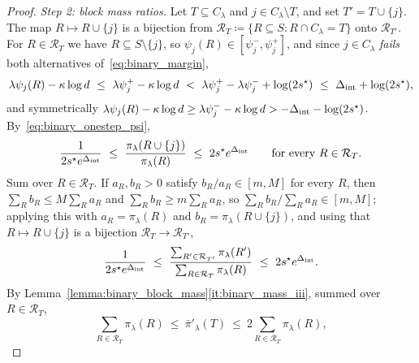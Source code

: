 \documentclass[aos]{imsart}%
\theoremstyle{plain}
\theoremstyle{definition}
\begin{document}
\begin{proof}
        \emph{Step 2: block mass ratios.} Let $T\subseteq C_\lambda$ and
        $j\in C_\lambda\setminus T$, and set $T'=T\cup\{j\}$. The map
        $R\mapsto R\cup\{j\}$ is a bijection from
        $\mathcal{R}_T\coloneq\{R\subseteq S:R\cap C_\lambda=T\}$ onto
        $\mathcal{R}_{T'}$. For $R\in\mathcal{R}_T$ we have
        $R\subseteq S\setminus\{j\}$, so
        $\psi_j(R)\in[\psi_j^{-},\psi_j^{+}]$, and since $j\in C_\lambda$
        \emph{fails} both alternatives of~\eqref{eq:binary_margin},
        \begin{equation*}
            \lambda\psi_j(R)-\kappa\log d\ \leq\
            \lambda\psi_j^{+}-\kappa\log d\ <\
            \lambda\psi_j^{+}-\lambda\psi_j^{-}+\log(2s^{\star})
            \ \leq\ \Delta_{\mathrm{int}}+\log(2s^{\star}),
        \end{equation*}
        and symmetrically
        $\lambda\psi_j(R)-\kappa\log d\geq\lambda\psi_j^{-}-\kappa\log
        d>-\Delta_{\mathrm{int}}-\log(2s^{\star})$. By~\eqref{eq:binary_onestep_psi},
        \begin{equation}
            \label{eq:binary_hybrid_flip}
            \frac{1}{2s^{\star}e^{\Delta_{\mathrm{int}}}}
            \ \leq\ \frac{\pi_\lambda(R\cup\{j\})}{\pi_\lambda(R)}
            \ \leq\ 2s^{\star}e^{\Delta_{\mathrm{int}}}
            \qquad\text{for every }R\in\mathcal{R}_T .
        \end{equation}
        Sum over $R\in\mathcal{R}_T$. If $a_R,b_R>0$ satisfy $b_R/a_R\in[m,M]$
        for every $R$, then $\sum_Rb_R\leq M\sum_Ra_R$ and
        $\sum_Rb_R\geq m\sum_Ra_R$, so $\sum_Rb_R/\sum_Ra_R\in[m,M]$; applying
        this with $a_R=\pi_\lambda(R)$ and $b_R=\pi_\lambda(R\cup\{j\})$, and
        using that $R\mapsto R\cup\{j\}$ is a bijection
        $\mathcal{R}_T\to\mathcal{R}_{T'}$,
        \begin{equation}
            \label{eq:binary_hybrid_sumratio}
            \frac{1}{2s^{\star}e^{\Delta_{\mathrm{int}}}}
            \ \leq\ \frac{\sum_{R'\in\mathcal{R}_{T'}}\pi_\lambda(R')}
            {\sum_{R\in\mathcal{R}_{T}}\pi_\lambda(R)}
            \ \leq\ 2s^{\star}e^{\Delta_{\mathrm{int}}} .
        \end{equation}
        By Lemma~\ref{lemma:binary_block_mass}\ref{it:binary_mass_iii}, summed
        over $R\in\mathcal{R}_T$,
        \begin{equation}
            \label{eq:binary_hybrid_sandwich}
            \sum_{R\in\mathcal{R}_T}\pi_\lambda(R)
            \ \leq\ \bar\pi'_\lambda(T)\ \leq\
            2\sum_{R\in\mathcal{R}_T}\pi_\lambda(R),
        \end{equation}

\end{proof}
\end{document}
